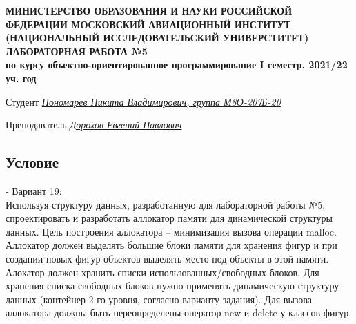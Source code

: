 \documentclass[12pt]{article}
\begin{document}
\begin{titlepage}
\begin{center}
\textbf{МИНИСТЕРСТВО ОБРАЗОВАНИЯ И НАУКИ РОССИЙСКОЙ ФЕДЕРАЦИИ
\medskip
МОСКОВСКИЙ АВИАЦИОННЫЙ ИНСТИТУТ
(НАЦИОНАЛЬНЫЙ ИССЛЕДОВАТЕЛЬСКИЙ УНИВЕРСТИТЕТ)
\vfill\vfill
{\Huge ЛАБОРАТОРНАЯ РАБОТА №5} \\
по курсу объектно-ориентированное программирование
I семестр, 2021/22 уч. год}
\end{center}
\vfill

Студент \uline{\it {Пономарев Никита Владимирович, группа М8О-207Б-20}\hfill}

Преподаватель \uline{\it {Дорохов Евгений Павлович}\hfill}

\vfill
\end{titlepage}

\subsection*{Условие}
 - Вариант 19:\\
Используя структуру данных, разработанную для лабораторной работы №5, спроектировать и 
разработать аллокатор памяти для динамической структуры данных.
Цель построения аллокатора – минимизация вызова операции malloc. Аллокатор должен 
выделять большие блоки памяти для хранения фигур и при создании новых фигур-объектов 
выделять место под объекты в этой памяти.
Алокатор должен хранить списки использованных/свободных блоков. Для хранения списка 
свободных блоков нужно применять динамическую структуру данных (контейнер 2-го уровня, 
согласно варианту задания).
Для вызова аллокатора должны быть переопределены оператор new и delete у классов-фигур.
\end{document}
